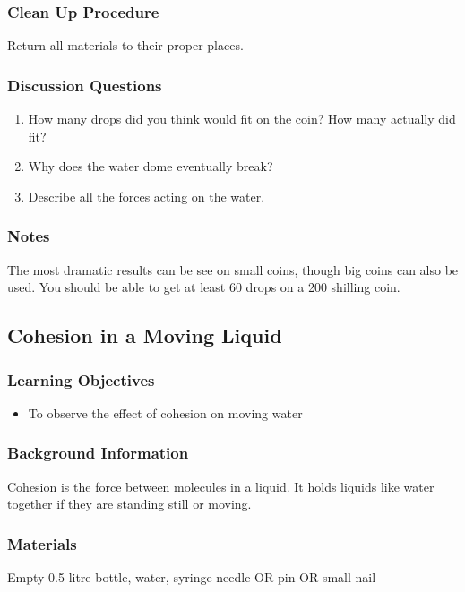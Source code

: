 \subsubsection*{Clean Up Procedure}
Return all materials to their proper places.

\subsubsection*{Discussion Questions}
\begin{enumerate}
\item{How many drops did you think would fit on the coin? How many actually did fit?}
\item{Why does the water dome eventually break?}
\item{Describe all the forces acting on the water.}
\end{enumerate}

\subsubsection*{Notes}
The most dramatic results can be see on small coins, though big coins can also be used. You should be able to get at least 60 drops on a 200 shilling coin.

\subsection{Cohesion in a Moving Liquid}

\subsubsection*{Learning Objectives}
\begin{itemize}
\item{To observe the effect of cohesion on moving water}
\end{itemize}

\subsubsection*{Background Information}
Cohesion is the force between molecules in a liquid. It holds liquids like water together if they are standing still or moving.

\subsubsection*{Materials}
Empty 0.5 litre bottle, water, syringe needle OR pin OR small nail

